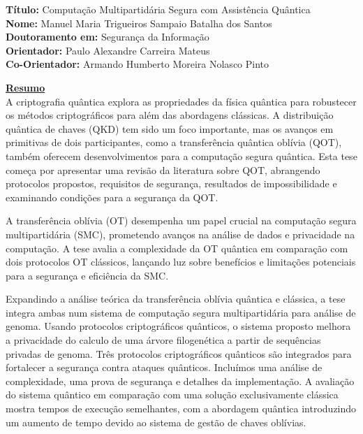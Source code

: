 \documentclass[12pt]{report}
\begin{document}
	


\noindent \textbf{T\'{i}tulo:} Computa\c{c}\~{a}o Multipartid\'{a}ria Segura com Assist\^{e}ncia Qu\^{a}ntica\\
\textbf{Nome:} Manuel Maria Trigueiros Sampaio Batalha dos Santos\\
\textbf{Doutoramento em:} Seguran\c{c}a da Informa\c{c}\~{a}o\\
\textbf{Orientador:} Paulo Alexandre Carreira Mateus\\
\textbf{Co-Orientador:} Armando Humberto Moreira Nolasco Pinto\\
\vspace{2\baselineskip}

\underline{\textbf{Resumo}}\\
A criptografia quântica explora as propriedades da física quântica para robustecer os métodos criptográficos para além das abordagens clássicas. A distribuição quântica de chaves (QKD) tem sido um foco importante, mas os avanços em primitivas de dois participantes, como a transferência quântica oblívia (QOT), também oferecem desenvolvimentos para a computação segura quântica. Esta tese começa por apresentar uma revisão da literatura sobre QOT, abrangendo protocolos propostos, requisitos de segurança, resultados de impossibilidade e examinando condições para a segurança da QOT.

A transferência oblívia (OT) desempenha um papel crucial na computação segura multipartidária (SMC), prometendo avanços na análise de dados e privacidade na computação. A tese avalia a complexidade da OT quântica em comparação com dois protocolos OT clássicos, lançando luz sobre benefícios e limitações potenciais para a segurança e eficiência da SMC.

Expandindo a análise teórica da transferência oblívia quântica e clássica, a tese integra ambas num sistema de computação segura multipartidária para análise de genoma. Usando protocolos criptográficos quânticos, o sistema proposto melhora a privacidade do calculo de uma árvore filogenética a partir de sequências privadas de genoma. Três protocolos criptográficos quânticos são integrados para fortalecer a segurança contra ataques quânticos. Incluímos uma análise de complexidade, uma prova de segurança e detalhes da implementação. A avaliação do sistema quântico em comparação com uma solução exclusivamente clássica mostra tempos de execução semelhantes, com a abordagem quântica introduzindo um aumento de tempo devido ao sistema de gestão de chaves oblívias.
\end{document}

